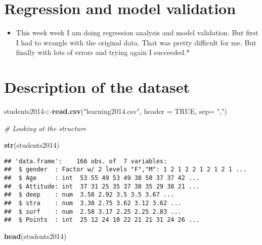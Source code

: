 \documentclass[]{article}
\title{}
\author{}
\date{}
\newenvironment{Shaded}{\begin{snugshade}}{\end{snugshade}}
\newcommand{\CommentTok}[1]{\textcolor[rgb]{0.56,0.35,0.01}{\textit{#1}}}
\newcommand{\DataTypeTok}[1]{\textcolor[rgb]{0.13,0.29,0.53}{#1}}
\newcommand{\KeywordTok}[1]{\textcolor[rgb]{0.13,0.29,0.53}{\textbf{#1}}}
\newcommand{\NormalTok}[1]{#1}
\newcommand{\OtherTok}[1]{\textcolor[rgb]{0.56,0.35,0.01}{#1}}
\newcommand{\StringTok}[1]{\textcolor[rgb]{0.31,0.60,0.02}{#1}}
\providecommand{\tightlist}{%
  \setlength{\itemsep}{0pt}\setlength{\parskip}{0pt}}
\begin{document}
\hypertarget{regression-and-model-validation}{%
\section{Regression and model
validation}\label{regression-and-model-validation}}

\begin{itemize}
\tightlist
\item
  This week week I am doing regression analysis and model validation.
  But first I had to wrangle with the original data. That was pretty
  difficult for me. But finally with lots of errors and trying again I
  succeeded.*
\end{itemize}

\hypertarget{description-of-the-dataset}{%
\section{Description of the dataset}\label{description-of-the-dataset}}

\begin{Shaded}
\begin{Highlighting}[]
\NormalTok{students2014<-}\KeywordTok{read.csv}\NormalTok{(}\StringTok{"learning2014.csv"}\NormalTok{, }\DataTypeTok{header =} \OtherTok{TRUE}\NormalTok{, }\DataTypeTok{sep=} \StringTok{","}\NormalTok{)}

\CommentTok{# Looking at the structure}

\KeywordTok{str}\NormalTok{(students2014)}
\end{Highlighting}
\end{Shaded}

\begin{verbatim}
## 'data.frame':    166 obs. of  7 variables:
##  $ gender  : Factor w/ 2 levels "F","M": 1 2 1 2 2 1 2 1 2 1 ...
##  $ Age     : int  53 55 49 53 49 38 50 37 37 42 ...
##  $ Attitude: int  37 31 25 35 37 38 35 29 38 21 ...
##  $ deep    : num  3.58 2.92 3.5 3.5 3.67 ...
##  $ stra    : num  3.38 2.75 3.62 3.12 3.62 ...
##  $ surf    : num  2.58 3.17 2.25 2.25 2.83 ...
##  $ Points  : int  25 12 24 10 22 21 21 31 24 26 ...
\end{verbatim}

\begin{Shaded}
\begin{Highlighting}[]
\KeywordTok{head}\NormalTok{(students2014)}
\end{Highlighting}
\end{Shaded}
\end{document}
